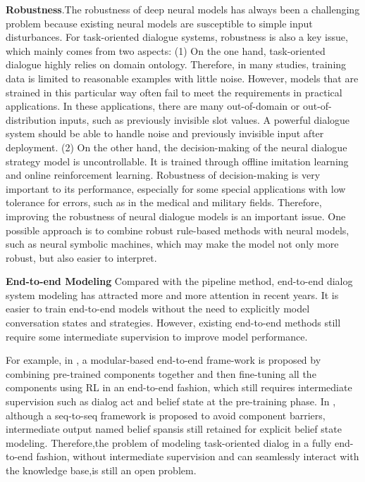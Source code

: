 \documentclass[10pt,twocolumn,letterpaper]{article}
\begin{document}
\textbf{Robustness}.The robustness of deep neural models has always been a challenging problem because existing neural models are susceptible to simple input disturbances. For task-oriented dialogue systems, robustness is also a key issue, which mainly comes from two aspects: (1) On the one hand, task-oriented dialogue highly relies on domain ontology. Therefore, in many studies, training data is limited to reasonable examples with little noise. However, models that are strained in this particular way often fail to meet the requirements in practical applications. In these applications, there are many out-of-domain or out-of-distribution inputs\cite{zheng2020out}, such as previously invisible slot values. A powerful dialogue system should be able to handle noise and previously invisible input after deployment. (2) On the other hand, the decision-making of the neural dialogue strategy model is uncontrollable. It is trained through offline imitation learning and online reinforcement learning. Robustness of decision-making is very important to its performance, especially for some special applications with low tolerance for errors, such as in the medical and military fields. Therefore, improving the robustness of neural dialogue models is an important issue. One possible approach is to combine robust rule-based methods with neural models, such as neural symbolic machines\cite{liang2016neural,segler2017neural}, which may make the model not only more robust, but also easier to interpret.

\textbf{End-to-end Modeling}
Compared with the pipeline method, end-to-end dialog system modeling has attracted more and more attention in recent years. It is easier to train end-to-end models without the need to explicitly model conversation states and strategies. However, existing end-to-end methods still require some intermediate supervision to improve model performance.

For example, in \cite{wen2016network}, a modular-based end-to-end frame-work  is  proposed  by  combining  pre-trained  components together and then fine-tuning all the components using RL in an end-to-end fashion, which still requires intermediate supervision such as dialog act and belief state at the pre-training phase. In \cite{lei2018sequicity}, although a seq-to-seq framework is proposed to avoid component barriers,  intermediate  output  named belief  spansis  still retained for explicit belief state modeling.  Therefore,the problem of modeling task-oriented dialog in a fully end-to-end  fashion,  without  intermediate  supervision and can seamlessly interact with the knowledge base,is still an open problem.

\clearpage
{\small


}
\end{document}
